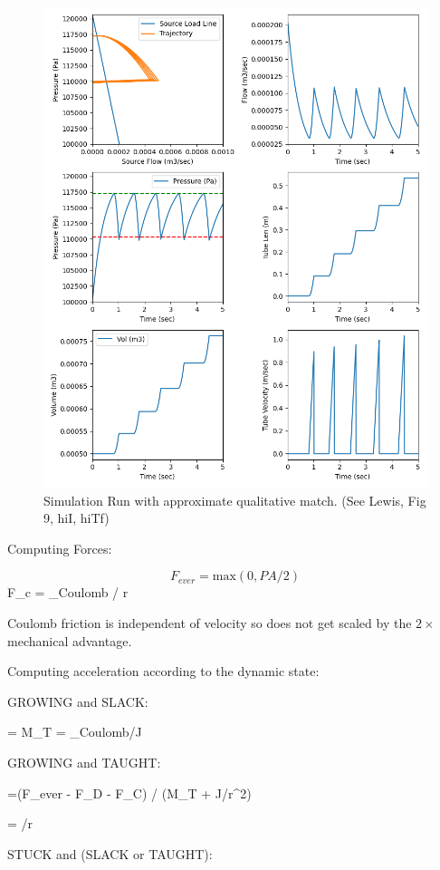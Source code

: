 \documentclass[letterpaper]{article}
\begin{document}
\begin{figure}\centering
\includegraphics[width=.75\textwidth]{Figure_9HhiI_hiTf_baseline.png}
\caption{Simulation Run with approximate qualitative match.  (See Lewis, Fig 9, hiI, hiTf)}
\label{Fig:baselineResults}
\end{figure}

Computing Forces:


\begin{equation}
  F_{ever} = \mathrm{max}(0, PA/2)
\end{equation}
\beq
  F_{c} = \tau_{Coulomb} / r
\eeq

Coulomb friction is independent of velocity so does not get scaled by the $2\times$ mechanical advantage.

Computing acceleration according to the dynamic state:

GROWING and SLACK:

\beq
{} =   {M_T}
\eeq
\beq
\dot{\theta} = \tau_{Coulomb}/J
\eeq

GROWING and TAUGHT:

\beq
{} =(F_{ever} - F_D - F_C) /  (M_T + J/r^2)
\eeq

\beq
\ddot{\theta} = /r
\eeq

STUCK and (SLACK or TAUGHT):
\end{document}
